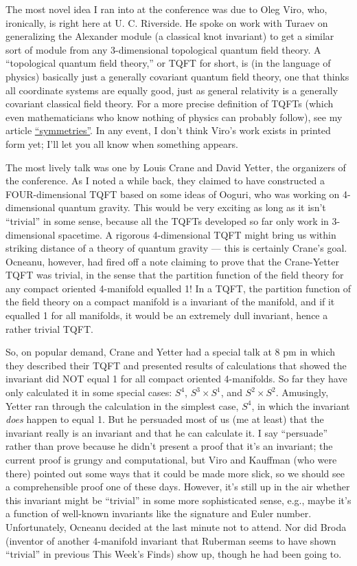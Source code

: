 \documentclass{article}
\begin{document}
The most novel idea I ran into at the conference was due to Oleg Viro,
who, ironically, is right here at U. C. Riverside. He spoke on work with
Turaev on generalizing the Alexander module (a classical knot invariant)
to get a similar sort of module from any 3-dimensional topological
quantum field theory. A ``topological quantum field theory,'' or TQFT
for short, is (in the language of physics) basically just a generally
covariant quantum field theory, one that thinks all coordinate systems
are equally good, just as general relativity is a generally covariant
classical field theory. For a more precise definition of TQFTs (which
even mathematicians who know nothing of physics can probably follow),
see my article
\href{http://math.ucr.edu/home/baez/symmetries.html}{``symmetries''}. In
any event, I don't think Viro's work exists in printed form yet; I'll
let you all know when something appears.

The most lively talk was one by Louis Crane and David Yetter, the
organizers of the conference. As I noted a while back, they claimed to
have constructed a FOUR-dimensional TQFT based on some ideas of Ooguri,
who was working on 4-dimensional quantum gravity. This would be very
exciting as long as it isn't ``trivial'' in some sense, because all the
TQFTs developed so far only work in 3-dimensional spacetime. A rigorous
4-dimensional TQFT might bring us within striking distance of a theory
of quantum gravity --- this is certainly Crane's goal. Ocneanu, however,
had fired off a note claiming to prove that the Crane-Yetter TQFT was
trivial, in the sense that the partition function of the field theory
for any compact oriented 4-manifold equalled 1! In a TQFT, the partition
function of the field theory on a compact manifold is a invariant of the
manifold, and if it equalled 1 for all manifolds, it would be an
extremely dull invariant, hence a rather trivial TQFT.

So, on popular demand, Crane and Yetter had a special talk at 8 pm in
which they described their TQFT and presented results of calculations
that showed the invariant did NOT equal 1 for all compact oriented
4-manifolds. So far they have only calculated it in some special cases:
\(S^4\), \(S^3 \times S^1\), and \(S^2 \times S^2\). Amusingly, Yetter
ran through the calculation in the simplest case, \(S^4\), in which the
invariant \emph{does} happen to equal 1. But he persuaded most of us (me
at least) that the invariant really is an invariant and that he can
calculate it. I say ``persuade'' rather than prove because he didn't
present a proof that it's an invariant; the current proof is grungy and
computational, but Viro and Kauffman (who were there) pointed out some
ways that it could be made more slick, so we should see a comprehensible
proof one of these days. However, it's still up in the air whether this
invariant might be ``trivial'' in some more sophisticated sense, e.g.,
maybe it's a function of well-known invariants like the signature and
Euler number. Unfortunately, Ocneanu decided at the last minute not to
attend. Nor did Broda (inventor of another 4-manifold invariant that
Ruberman seems to have shown ``trivial'' in previous This Week's Finds)
show up, though he had been going to.
\end{document}
